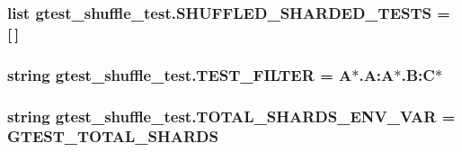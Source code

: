 \subsubsection[{\texorpdfstring{S\+H\+U\+F\+F\+L\+E\+D\+\_\+\+S\+H\+A\+R\+D\+E\+D\+\_\+\+T\+E\+S\+TS}{SHUFFLED_SHARDED_TESTS}}]{\setlength{\rightskip}{0pt plus 5cm}list gtest\+\_\+shuffle\+\_\+test.\+S\+H\+U\+F\+F\+L\+E\+D\+\_\+\+S\+H\+A\+R\+D\+E\+D\+\_\+\+T\+E\+S\+TS = \mbox{[}$\,$\mbox{]}}\hypertarget{namespacegtest__shuffle__test_a3603885677e36438fd2d7521db51bcb4}{}\label{namespacegtest__shuffle__test_a3603885677e36438fd2d7521db51bcb4}
\subsubsection[{\texorpdfstring{T\+E\+S\+T\+\_\+\+F\+I\+L\+T\+ER}{TEST_FILTER}}]{\setlength{\rightskip}{0pt plus 5cm}string gtest\+\_\+shuffle\+\_\+test.\+T\+E\+S\+T\+\_\+\+F\+I\+L\+T\+ER = \textquotesingle{}A$\ast$.A\+:A$\ast$.B\+:C$\ast$\textquotesingle{}}\hypertarget{namespacegtest__shuffle__test_ac2a2a6c7c009be4f94bc9c8bc0c51bb5}{}\label{namespacegtest__shuffle__test_ac2a2a6c7c009be4f94bc9c8bc0c51bb5}
\subsubsection[{\texorpdfstring{T\+O\+T\+A\+L\+\_\+\+S\+H\+A\+R\+D\+S\+\_\+\+E\+N\+V\+\_\+\+V\+AR}{TOTAL_SHARDS_ENV_VAR}}]{\setlength{\rightskip}{0pt plus 5cm}string gtest\+\_\+shuffle\+\_\+test.\+T\+O\+T\+A\+L\+\_\+\+S\+H\+A\+R\+D\+S\+\_\+\+E\+N\+V\+\_\+\+V\+AR = \textquotesingle{}G\+T\+E\+S\+T\+\_\+\+T\+O\+T\+A\+L\+\_\+\+S\+H\+A\+R\+DS\textquotesingle{}}\hypertarget{namespacegtest__shuffle__test_a29088c2bb51a4550fa2a668d972f973a}{}\label{namespacegtest__shuffle__test_a29088c2bb51a4550fa2a668d972f973a}
